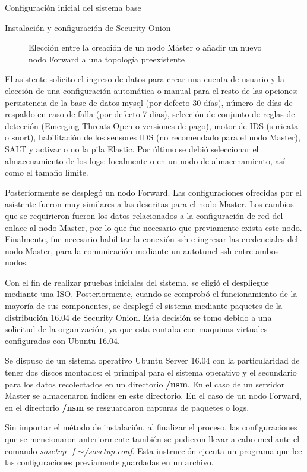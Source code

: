 \begin{section}{Configuración inicial del sistema base}
\begin{subsection}{Instalación y configuración de Security Onion}
\begin{figure}[H]
            \caption{Elección entre la creación de un nodo Máster o añadir un nuevo nodo Forward a una topología preexistente}
            \label{fig:figura_38_b_sonion_modo}
        \end{figure}
        El asistente solicito el ingreso de datos para crear una cuenta de usuario y la elección de una configuración automática o manual para el resto de las opciones: persistencia de la base de datos mysql (por defecto 30 días), número de días de respaldo en caso de falla (por defecto 7 dias), selección de conjunto de reglas de detección (Emerging Threats Open o versiones de pago), motor de IDS (suricata o snort), habilitación de los sensores IDS (no recomendado para el nodo Master), SALT y activar o no la pila Elastic. Por último se debió seleccionar el almacenamiento de los logs: localmente o en un nodo de almacenamiento, así como el tamaño límite.\par
        Posteriormente se desplegó un nodo Forward. Las configuraciones ofrecidas por el asistente fueron muy similares a las descritas para el nodo Master. Los cambios que se requirieron fueron los datos relacionados a la configuración de red del enlace al nodo Master, por lo que fue necesario que previamente exista este nodo. Finalmente, fue necesario habilitar la conexión ssh e ingresar las credenciales del nodo Master, para la comunicación mediante un autotunel ssh entre ambos nodos.\par
        Con el fin de realizar pruebas iniciales del sistema, se eligió el despliegue mediante una ISO. Posteriormente, cuando se comprobó el funcionamiento de la mayoría de sus componentes, se desplegó el sistema mediante paquetes de la distribución 16.04 de Security Onion. Esta decisión se tomo debido a una solicitud de la organización, ya que esta contaba con maquinas virtuales configuradas con Ubuntu 16.04. \par
        Se dispuso de un sistema operativo Ubuntu Server 16.04 con la particularidad de tener dos discos montados: el principal para el sistema operativo y el secundario para los datos recolectados en un directorio \textbf{/nsm}. En el caso de un servidor Master se almacenaron índices en este directorio. En el caso de un nodo Forward, en el directorio \textbf{/nsm} se resguardaron capturas de paquetes o logs. \par 
        Sin importar el método de instalación, al finalizar el proceso, las configuraciones que se mencionaron anteriormente también se pudieron llevar a cabo mediante el comando \textit{sosetup -f $\sim$/sosetup.conf}. Esta instrucción ejecuta un programa que lee las configuraciones previamente guardadas en un archivo.\par

\end{subsection}
\end{section}
